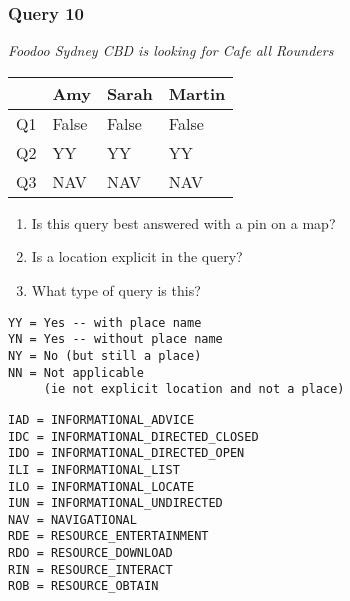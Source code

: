 \begin{frame}[fragile]
\frametitle{Query 10}
\vspace{1em}

\emph{Foodoo Sydney CBD is looking for Cafe all Rounders}

\vfill

\begin{table}
  \centering
  \begin{tabular}{ l l l l }
    & \textbf{Amy} & \textbf{Sarah} & \textbf{Martin}\\
    \toprule
    Q1 & False & False & False\\
Q2 & YY & YY & YY\\
Q3 & NAV & NAV & NAV\\
    \bottomrule
  \end{tabular}
\end{table}

\vfill

\tiny{

\begin{enumerate}
\item Is this query best answered with a pin on a map?
\item Is a location explicit in the query?
\item What type of query is this?
\end{enumerate}

\vfill

\begin{multicols}{2}
\begin{verbatim}
YY = Yes -- with place name
YN = Yes -- without place name
NY = No (but still a place)
NN = Not applicable 
     (ie not explicit location and not a place)
\end{verbatim}

\columnbreak
\begin{verbatim}
IAD = INFORMATIONAL_ADVICE
IDC = INFORMATIONAL_DIRECTED_CLOSED
IDO = INFORMATIONAL_DIRECTED_OPEN
ILI = INFORMATIONAL_LIST
ILO = INFORMATIONAL_LOCATE
IUN = INFORMATIONAL_UNDIRECTED
NAV = NAVIGATIONAL
RDE = RESOURCE_ENTERTAINMENT
RDO = RESOURCE_DOWNLOAD
RIN = RESOURCE_INTERACT
ROB = RESOURCE_OBTAIN
\end{verbatim}
\end{multicols}
}

\end{frame}


